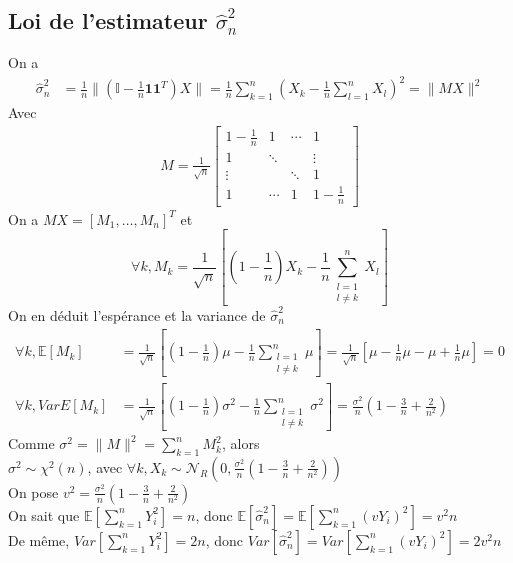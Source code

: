 \documentclass{report}
\begin{document}
		\subsection{Loi de l'estimateur $\hat\sigma^2_n$}
			On a
			\begin{align*}
				\hat\sigma^2_n &= \frac{1}{n} \lVert (\mathbb{I} - \frac{1}{n}\textbf{1}\textbf{1}^T)X \rVert = \frac{1}{n} \sum\limits_{k=1}^n (X_k - \frac{1}{n}\sum\limits_{l=1}^n X_l)^2 = \lVert MX \rVert^2
			\end{align*}
			Avec
			\begin{align*}
				M = \frac{1}{\sqrt n}
				\left[
				\begin{array}{cccc}
					1-\frac{1}{n} & 1 & \cdots & 1 \\
					1 & \ddots & & \vdots \\
					\vdots & & \ddots & 1 \\
					1 &  \cdots & 1 & 1-\frac{1}{n}
				\end{array}
				\right]
			\end{align*}
			On a $MX = [M_1, \ldots, M_n]^T$ et
			\[ \forall k, M_k = \frac{1}{\sqrt n}[ (1-\frac{1}{n})X_k -\frac{1}{n}\sum\limits_{\substack{
            l=1\\
            l \neq k}}^n X_l ] \]
            On en déduit l'espérance et la variance de $\hat\sigma^2_n$\\
            \begin{align*}
            	\forall k, \mathbb{E}[M_k] &= \frac{1}{\sqrt n}[(1-\frac{1}{n})\mu - \frac{1}{n}\sum\limits_{\substack{
            	l=1\\
            	l \neq k}}^n \mu] = \frac{1}{\sqrt n}[ \mu - \frac{1}{n}\mu - \mu + \frac{1}{n}\mu ] = 0 \\
            	\forall k, Var{E}[M_k] &= \frac{1}{\sqrt n}[(1-\frac{1}{n})\sigma^2 - \frac{1}{n}\sum\limits_{\substack{
            	l=1\\
            	l \neq k}}^n \sigma^2] = \frac{\sigma^2}{n}(1-\frac{3}{n}+\frac{2}{n^2})
            \end{align*}
            Comme $\sigma^2 = \lVert M \rVert^2 = \sum\limits_{k=1}^n M_k^2$, alors \\
            $\sigma^2 \sim \chi^2(n)$, avec $\forall k, X_k \sim \mathcal{N}_{R}(0, \frac{\sigma^2}{n}(1-\frac{3}{n}+\frac{2}{n^2}))$\\
            On pose $v^2 = \frac{\sigma^2}{n}(1-\frac{3}{n}+\frac{2}{n^2})$\\
            On sait que $\mathbb{E}[\sum\limits_{k=1}^n Y_i^2] = n$, donc $\mathbb{E}[\hat\sigma^2_n] = \mathbb{E}[\sum\limits_{k=1}^n (v Y_i)^2] = v^2n$\\
            De même, $Var[\sum\limits_{k=1}^n Y_i^2] =  2n$, donc $Var[\hat\sigma^2_n] = Var[\sum\limits_{k=1}^n (v Y_i)^2] = 2v^2n $
\end{document}
